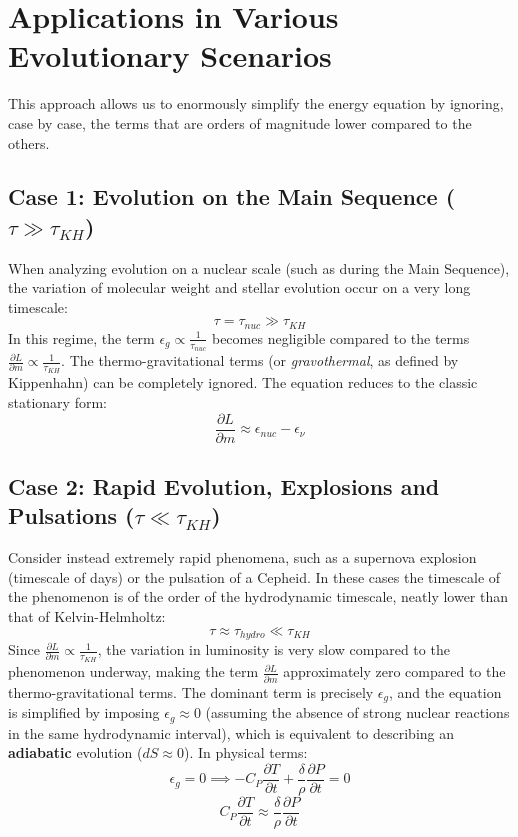 \section{Applications in Various Evolutionary Scenarios}

This approach allows us to enormously simplify the energy equation by ignoring, case by case, the terms that are orders of magnitude lower compared to the others.

\subsection{Case 1: Evolution on the Main Sequence ($\tau \gg \tau_{KH}$)}
When analyzing evolution on a nuclear scale (such as during the Main Sequence), the variation of molecular weight and stellar evolution occur on a very long timescale:
\begin{equation}
\tau = \tau_{nuc} \gg \tau_{KH}
\end{equation}
In this regime, the term $\epsilon_g \propto \frac{1}{\tau_{nuc}}$ becomes negligible compared to the terms $\frac{\partial L}{\partial m} \propto \frac{1}{\tau_{KH}}$. The thermo-gravitational terms (or \textit{gravothermal}, as defined by Kippenhahn) can be completely ignored. The equation reduces to the classic stationary form:
\begin{equation}
\frac{\partial L}{\partial m} \approx \epsilon_{nuc} - \epsilon_{\nu}
\end{equation}

\subsection{Case 2: Rapid Evolution, Explosions and Pulsations ($\tau \ll \tau_{KH}$)}
Consider instead extremely rapid phenomena, such as a supernova explosion (timescale of days) or the pulsation of a Cepheid. In these cases the timescale of the phenomenon is of the order of the hydrodynamic timescale, neatly lower than that of Kelvin-Helmholtz:
\begin{equation}
\tau \approx \tau_{hydro} \ll \tau_{KH}
\end{equation}
Since $\frac{\partial L}{\partial m} \propto \frac{1}{\tau_{KH}}$, the variation in luminosity is very slow compared to the phenomenon underway, making the term $\frac{\partial L}{\partial m}$ approximately zero compared to the thermo-gravitational terms. The dominant term is precisely $\epsilon_g$, and the equation is simplified by imposing $\epsilon_g \approx 0$ (assuming the absence of strong nuclear reactions in the same hydrodynamic interval), which is equivalent to describing an \textbf{adiabatic} evolution ($dS \approx 0$). In physical terms:
\begin{equation}
\epsilon_g = 0 \implies -C_P \frac{\partial T}{\partial t} + \frac{\delta}{\rho} \frac{\partial P}{\partial t} = 0
\end{equation}
\begin{equation}
C_P \frac{\partial T}{\partial t} \approx \frac{\delta}{\rho} \frac{\partial P}{\partial t}
\end{equation}


